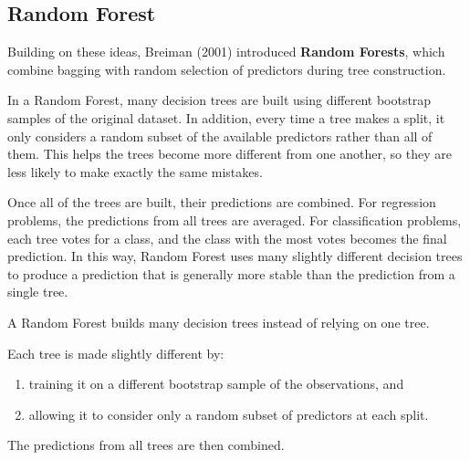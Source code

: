 \documentclass[
  letterpaper,
  DIV=11,
  numbers=noendperiod]{scrreprt}
\providecommand{\tightlist}{%
  \setlength{\itemsep}{0pt}\setlength{\parskip}{0pt}}
\begin{document}
\subsection{Random Forest}\label{random-forest-1}

Building on these ideas, Breiman (2001) introduced \textbf{Random
Forests}, which combine bagging with random selection of predictors
during tree construction.

In a Random Forest, many decision trees are built using different
bootstrap samples of the original dataset. In addition, every time a
tree makes a split, it only considers a random subset of the available
predictors rather than all of them. This helps the trees become more
different from one another, so they are less likely to make exactly the
same mistakes.

Once all of the trees are built, their predictions are combined. For
regression problems, the predictions from all trees are averaged. For
classification problems, each tree votes for a class, and the class with
the most votes becomes the final prediction. In this way, Random Forest
uses many slightly different decision trees to produce a prediction that
is generally more stable than the prediction from a single tree.

\begin{tcolorbox}[enhanced jigsaw, arc=.35mm, bottomrule=.15mm, bottomtitle=1mm, breakable, colback=white, colbacktitle=quarto-callout-note-color!10!white, colframe=quarto-callout-note-color-frame, coltitle=black, left=2mm, leftrule=.75mm, opacityback=0, opacitybacktitle=0.6, rightrule=.15mm, title=\textcolor{quarto-callout-note-color}{\faInfo}\hspace{0.5em}{The main idea}, titlerule=0mm, toprule=.15mm, toptitle=1mm]

A Random Forest builds many decision trees instead of relying on one
tree.

Each tree is made slightly different by:

\begin{enumerate}
\def\labelenumi{\arabic{enumi}.}
\tightlist
\item
  training it on a different bootstrap sample of the observations, and
\item
  allowing it to consider only a random subset of predictors at each
  split.
\end{enumerate}

The predictions from all trees are then combined.

\end{tcolorbox}
\end{document}
